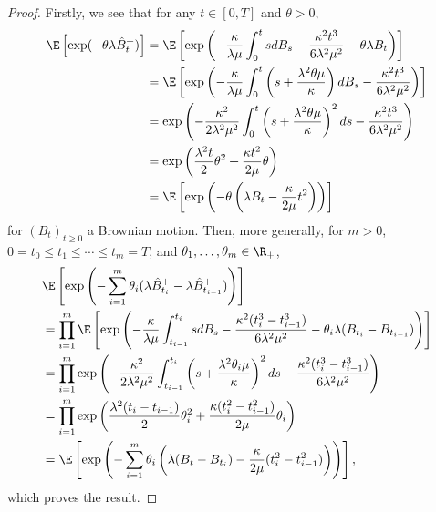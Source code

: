  \begin{proof}
 Firstly, we see that for any $t\in [0,T]$ and $\theta>0$,
 \begin{align*} \E\left[\exp(-\theta \lambda \hat{B}_t^+)\right] &= \E \left[ \exp\left(-\frac{\kappa}{\lambda \mu}\int_0^t s dB_s-\frac{\kappa^2 t^3}{6\lambda^2\mu^2}-\theta\lambda B_t  \right)\right]\\
 &=\E\left[\exp \left( -\frac{\kappa}{\lambda \mu}\int_0^t \left(s+\frac{\lambda^2\theta \mu}{\kappa}\right) dB_s -\frac{\kappa^2 t^3}{6\lambda^2\mu^2}\right)\right] \\
 &= \exp\left(-\frac{\kappa^2}{2\lambda^2 \mu^2}\int_0^t \left(s+\frac{\lambda^2\theta \mu}{\kappa}\right)^2 ds -\frac{\kappa^2 t^3}{6\lambda^2\mu^2}\right)\\
 &=\exp\left(\frac{\lambda^2 t}{2}\theta^2+\frac{\kappa t^2}{2\mu}\theta \right)\\
 &= \E \left[\exp\left(-\theta\left(\lambda B_t - \frac{\kappa}{2\mu} t^2\right)\right)\right]
 \end{align*}
 for $(B_t)_{t\geq 0}$ a Brownian motion.
 Then, more generally, for $m>0$, $0=t_0\leq t_1\leq \cdots \leq t_m=T$, and $\theta_1, \dots, \theta_m \in \R_+$, 
 \begin{align*}
     &\E\left[\exp\left(-\sum_{i=1}^m \theta_i(\lambda\hat{B}_{t_i}^+-\lambda\hat{B}_{t_{i-1}}^+)\right)\right]\\
     &= \prod_{i=1}^m \E\left[\exp\left(-\frac{\kappa}{\lambda\mu} \int _{t_{i-1}}^{t_i} s dB_s-\frac{\kappa^2 (t_i^3-t_{i-1}^3)}{6\lambda^2 \mu^2}-\theta_i \lambda  (B_{t_i}-B_{t_{i-1}})\right)\right]\\
     &= \prod_{i=1}^m  \exp\left( -\frac{\kappa^2}{2\lambda^2 \mu^2}\int_{t_{i-1}}^{t_i}\left(s+\frac{\lambda^2\theta_i\mu}{\kappa}\right)^2 ds - \frac{\kappa^2 (t_i^3-t_{i-1}^3)}{6\lambda^2 \mu^2} \right)\\
     &=  \prod_{i=1}^m \exp\left(\frac{ \lambda^2 (t_i-t_{i-1}) }{2}\theta_i^2+\frac{\kappa (t_i^2-t_{i-1}^2)}{2\mu}\theta_i \right)\\
     &=\E \left[\exp\left(-\sum_{i=1}^m\theta_i\left(\lambda (B_t-B_{t_i}) - \frac{\kappa}{2\mu} (t_i^2-t_{i-1}^2)\right)\right)\right],
 \end{align*}
 which proves the result.
 
\end{proof}
